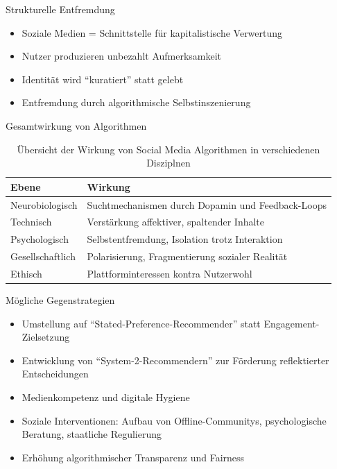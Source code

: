 \begin{frame}{Strukturelle Entfremdung~\cite{rey_alienation_2012}}
    \begin{itemize}
        \item Soziale Medien = Schnittstelle für kapitalistische Verwertung
        \item Nutzer produzieren unbezahlt Aufmerksamkeit
        \item Identität wird \enquote{kuratiert} statt gelebt
        \item Entfremdung durch algorithmische Selbstinszenierung
    \end{itemize}
\end{frame}
\begin{frame}{Gesamtwirkung von Algorithmen}
    \begin{table}
        \begin{tabular}{@{}p{3.5cm}p{6.5cm}@{}}
            \toprule
            \textbf{Ebene} & \textbf{Wirkung} \\
            \midrule
            Neurobiologisch & Suchtmechanismen durch Dopamin und Feedback-Loops \\
            Technisch & Verstärkung affektiver, spaltender Inhalte \\
            Psychologisch & Selbstentfremdung, Isolation trotz Interaktion \\
            Gesellschaftlich & Polarisierung, Fragmentierung sozialer Realität \\
            Ethisch & Plattforminteressen kontra Nutzerwohl \\
            \bottomrule
        \end{tabular}
        \caption{Übersicht der Wirkung von Social Media Algorithmen in verschiedenen Disziplnen}
        \label{tab:fazit}
    \end{table}
\end{frame}

\begin{frame}{Mögliche Gegenstrategien}
    \begin{itemize}
        \item Umstellung auf \enquote{Stated-Preference-Recommender} statt Engagement-Zielsetzung~\cite{milli_engagement_2024}
        \item Entwicklung von \enquote{System-2-Recommendern} zur Förderung reflektierter Entscheidungen~\cite{milli_engagement_2024}
        \item Medienkompetenz und digitale Hygiene~\cite{santini_social_2024}
        \item Soziale Interventionen: Aufbau von Offline-Communitys, psychologische Beratung, staatliche Regulierung~\cite{siddiq_social_2024}
        \item Erhöhung algorithmischer Transparenz und Fairness
    \end{itemize}
\end{frame}